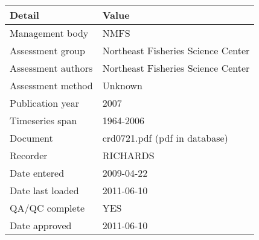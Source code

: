 \begin{table}[htb]
\centering
\begin{tabular}{lp{7cm}}
\toprule
Detail & Value \\
\midrule
Management body    & NMFS                               \\
Assessment group   & Northeast Fisheries Science Center \\
Assessment authors & Northeast Fisheries Science Center \\
Assessment method  & Unknown                            \\
Publication year   & 2007                               \\
Timeseries span    & 1964-2006                          \\
Document           & crd0721.pdf (pdf in database)      \\
Recorder           & RICHARDS                           \\
Date entered       & 2009-04-22                         \\
Date last loaded   & 2011-06-10                         \\
QA/QC complete     & YES                                \\
Date approved      & 2011-06-10                         \\
\bottomrule
\end{tabular}
\label{tab:assessdet}
\end{table}
